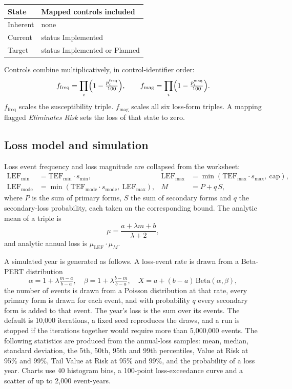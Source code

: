 \documentclass[11pt,a4paper]{article}
\begin{document}
\begin{center}
\begin{tabular}{@{}ll@{}}
\toprule
State & Mapped controls included \\
\midrule
Inherent & none \\
Current & status Implemented \\
Target & status Implemented or Planned \\
\bottomrule
\end{tabular}
\end{center}

Controls combine multiplicatively, in control-identifier order:
\begin{equation}
f_{\text{freq}}=\prod_i\Bigl(1-\tfrac{p^{\text{freq}}_i}{100}\Bigr),\qquad
f_{\text{mag}}=\prod_i\Bigl(1-\tfrac{p^{\text{mag}}_i}{100}\Bigr).
\end{equation}
$f_{\text{freq}}$ scales the susceptibility triple. $f_{\text{mag}}$ scales all six loss-form triples. A mapping flagged \emph{Eliminates Risk} sets the loss of that state to zero.

\subsection{Loss model and simulation}
Loss event frequency and loss magnitude are collapsed from the worksheet:
\begin{align}
\text{LEF}_{\min}&=\text{TEF}_{\min}\cdot s_{\min}, &
\text{LEF}_{\max}&=\min(\text{TEF}_{\max}\cdot s_{\max},\ \text{cap}),\\
\text{LEF}_{\text{mode}}&=\min(\text{TEF}_{\text{mode}}\cdot s_{\text{mode}},\ \text{LEF}_{\max}), &
M&=P+q\,S,
\end{align}
where $P$ is the sum of primary forms, $S$ the sum of secondary forms and $q$ the secondary-loss probability, each taken on the corresponding bound. The analytic mean of a triple is
\begin{equation}
\mu=\frac{a+\lambda m+b}{\lambda+2},
\end{equation}
and analytic annual loss is $\mu_{\text{LEF}}\cdot\mu_{M}$.

A simulated year is generated as follows. A loss-event rate is drawn from a Beta-PERT distribution
\begin{equation}
\alpha=1+\lambda\tfrac{m-a}{b-a},\quad \beta=1+\lambda\tfrac{b-m}{b-a},\quad X=a+(b-a)\,\mathrm{Beta}(\alpha,\beta),
\end{equation}
the number of events is drawn from a Poisson distribution at that rate, every primary form is drawn for each event, and with probability $q$ every secondary form is added to that event. The year's loss is the sum over its events. The default is 10,000 iterations, a fixed seed reproduces the draws, and a run is stopped if the iterations together would require more than 5,000,000 events. The following statistics are produced from the annual-loss samples: mean, median, standard deviation, the 5th, 50th, 95th and 99th percentiles, Value at Risk at 95\% and 99\%, Tail Value at Risk at 95\% and 99\%, and the probability of a loss year. Charts use 40 histogram bins, a 100-point loss-exceedance curve and a scatter of up to 2,000 event-years.
\end{document}
